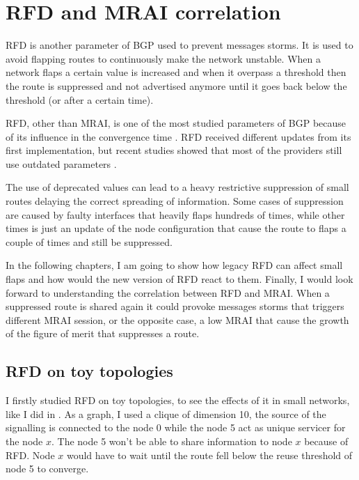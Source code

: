 \chapter{RFD and MRAI correlation}
\label{cha:bgp_rfd}


\ac{RFD} is another parameter of \ac{BGP} used to prevent messages storms.
It is used to avoid flapping routes to continuously make the network unstable.
When a network flaps a certain value is increased and when it overpass a threshold
then the route is suppressed and not advertised anymore until it goes back
below the threshold (or after a certain time).

\ac{RFD}, other than \ac{MRAI}, is one of the most studied parameters of \ac{BGP}
because of its influence in the convergence time \cite{mao2002route,pelsser2011route}.
\ac{RFD} received different updates from its first implementation, but recent
studies showed that most of the providers still use outdated parameters \cite{gray2020bgp}.

The use of deprecated values can lead to a heavy restrictive suppression
of small routes delaying the correct spreading of information.
Some cases of suppression are caused by faulty interfaces that heavily flaps hundreds of times,
while other times is just an update of the node configuration that
cause the route to flaps a couple of times and still be suppressed.

In the following chapters, I am going to show how legacy \ac{RFD} can affect
small flaps and how would the new version of \ac{RFD} react to them.
Finally, I would look forward to understanding the correlation between \ac{RFD}
and \ac{MRAI}.
When a suppressed route is shared again it could provoke messages storms that
triggers different \ac{MRAI} session, or the opposite case, a low \ac{MRAI} that
cause the growth of the figure of merit that suppresses a route.

\section{RFD on toy topologies}
\label{sec:bgp_rfd_toy}

I firstly studied \ac{RFD} on toy topologies, to see the effects of it in small
networks, like I did in .
As a graph, I used a clique of dimension \num{10}, the source of the signalling
is connected to the node \num{0} while the node \num{5} act as unique servicer
for the node $x$.
The node \num{5} won't be able to share information to node $x$ because of \ac{RFD}.
Node $x$ would have to wait until the route fell below the reuse threshold of
node \num{5} to converge.

